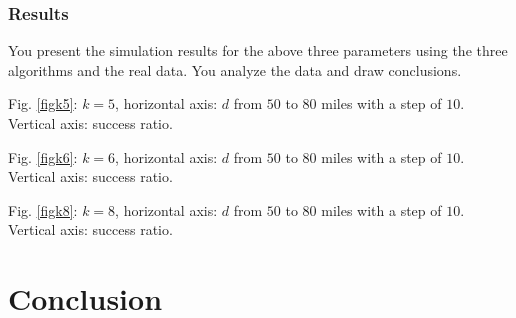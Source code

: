 \documentclass[conference]{IEEEtran}
\theoremstyle{definition}
\begin{document}
\subsubsection{Results}
{\color{red} You present the simulation results for the above three parameters using the three algorithms and the real data. You analyze the data and draw conclusions.}

Fig. \ref{figk5}: $k=5$, horizontal axis: $d$ from $50$ to $80$ miles with a step of $10$. Vertical axis: success ratio.

Fig. \ref{figk6}: $k=6$, horizontal axis: $d$ from $50$ to $80$ miles with a step of $10$. Vertical axis: success ratio.

Fig. \ref{figk8}: $k=8$, horizontal axis: $d$ from $50$ to $80$ miles with a step of $10$. Vertical axis: success ratio.

\section{Conclusion} \label{conclusion}



\end{document}
